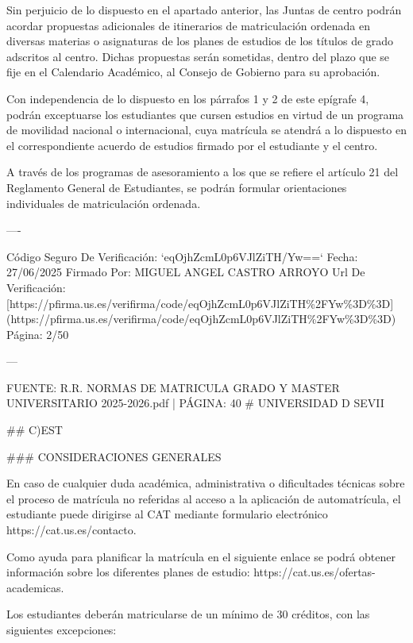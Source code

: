\documentclass{article}
\begin{document}
\begin{itemize}
\begin{itemize}
\begin{scriptsize}
                  Sin perjuicio de lo dispuesto en el apartado anterior, las Juntas de centro podrán acordar propuestas adicionales de itinerarios de matriculación ordenada en diversas materias o asignaturas de los planes de estudios de los títulos de grado adscritos al centro. Dichas propuestas serán sometidas, dentro del plazo que se fije en el Calendario Académico, al Consejo de Gobierno para su aprobación.

                  Con independencia de lo dispuesto en los párrafos 1 y 2 de este epígrafe 4, podrán exceptuarse los estudiantes que cursen estudios en virtud de un programa de movilidad nacional o internacional, cuya matrícula se atendrá a lo dispuesto en el correspondiente acuerdo de estudios firmado por el estudiante y el centro.

                  A través de los programas de asesoramiento a los que se refiere el artículo 21 del Reglamento General de Estudiantes, se podrán formular orientaciones individuales de matriculación ordenada.

                  ----

                  Código Seguro De Verificación: `eqOjhZcmL0p6VJlZiTH/Yw==`
                  Fecha: 27/06/2025
                  Firmado Por: MIGUEL ANGEL CASTRO ARROYO
                  Url De Verificación: [https://pfirma.us.es/verifirma/code/eqOjhZcmL0p6VJlZiTH\%2FYw\%3D\%3D](https://pfirma.us.es/verifirma/code/eqOjhZcmL0p6VJlZiTH\%2FYw\%3D\%3D)
                  Página: 2/50

                  ---

                  FUENTE: R.R. NORMAS DE MATRICULA GRADO Y MASTER UNIVERSITARIO 2025-2026.pdf | PÁGINA: 40
                  \# UNIVERSIDAD D SEVII

                  \#\# C)EST

                  \#\#\# CONSIDERACIONES GENERALES

                  En caso de cualquier duda académica, administrativa o dificultades técnicas sobre el proceso de matrícula no referidas al acceso a la aplicación de automatrícula, el estudiante puede dirigirse al CAT mediante formulario electrónico https://cat.us.es/contacto.

                  Como ayuda para planificar la matrícula en el siguiente enlace se podrá obtener información sobre los diferentes planes de estudio: https://cat.us.es/ofertas-academicas.

                  Los estudiantes deberán matricularse de un mínimo de 30 créditos, con las siguientes excepciones:


\end{scriptsize}
\end{itemize}
\end{itemize}
\end{document}
